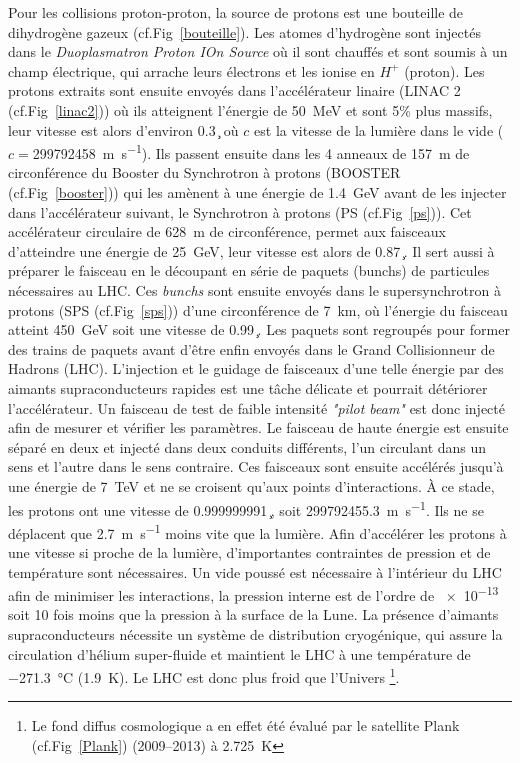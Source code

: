Pour les collisions proton-proton, la source de protons est une bouteille de dihydrogène gazeux (cf.Fig~\ref{bouteille}). Les atomes d’hydrogène sont injectés dans le \textit{Duoplasmatron Proton IOn Source} où il sont chauffés et sont soumis à un champ électrique, qui arrache leurs électrons et les ionise en $H^{+}$ (proton). Les protons extraits sont ensuite envoyés dans l'accélérateur linaire (LINAC 2 (cf.Fig~\ref{linac2})) où ils atteignent l'énergie de \SI{50}{\mega\eV} et sont \num{5}\% plus massifs, leur vitesse est alors d'environ \SI{0.3}{\c} où $c$ est la vitesse de la lumière dans le vide ($c=$\SI{299 792 458}{\meter\per\second}). Ils passent ensuite dans les \num{4} anneaux de \SI{157}{\meter} de circonférence du Booster du Synchrotron à protons (BOOSTER (cf.Fig~\ref{booster})) qui les amènent à une énergie de \SI{1.4}{\giga\eV} avant de les injecter dans l'accélérateur suivant, le Synchrotron à protons (PS (cf.Fig~\ref{ps})). Cet accélérateur circulaire de \SI{628}{\meter} de circonférence, permet aux faisceaux d'atteindre une énergie de \SI{25}{\giga\eV}, leur vitesse est alors de \SI{0.87}{\c}. Il sert aussi à préparer le faisceau en le découpant en série de paquets (bunchs) de particules nécessaires au LHC. Ces \textit{bunchs} sont ensuite envoyés dans le supersynchrotron à protons (SPS (cf.Fig~\ref{sps})) d'une circonférence de \SI{7}{\kilo\meter}, où l'énergie du faisceau atteint \SI{450}{\giga\eV} soit une vitesse de \SI{0.99}{\c}. Les paquets sont regroupés pour former des trains de paquets avant d'être enfin envoyés dans le Grand Collisionneur de Hadrons (LHC). L'injection et le guidage de faisceaux d'une telle énergie par des aimants supraconducteurs rapides est une tâche délicate et pourrait détériorer l'accélérateur. Un faisceau de test de faible intensité \textit{"pilot beam"} est donc injecté afin de mesurer et vérifier les paramètres. Le faisceau de haute énergie est ensuite séparé en deux et injecté dans deux conduits différents, l'un circulant dans un sens et l'autre dans le sens contraire. Ces faisceaux sont ensuite accélérés jusqu'à une énergie de \SI{7}{\tera\eV} et ne se croisent qu'aux points d'interactions. À ce stade, les protons ont une vitesse de \SI{0.999999991}{\c}, soit \SI{299 792 455,3}{\meter\per\second}. Ils ne se déplacent que \SI{2.7}{\meter\per\second} moins vite que la lumière. Afin d'accélérer les protons à une vitesse si proche de la lumière, d'importantes contraintes de pression et de température sont nécessaires. Un vide poussé est nécessaire à l'intérieur du LHC afin de minimiser les interactions, la pression interne est de l'ordre de \SI{e-13}{\atm} soit \num{10} fois moins que la pression à la surface de la Lune. La présence d'aimants supraconducteurs nécessite un système de distribution cryogénique, qui assure la circulation d'hélium super-fluide et maintient le LHC à une température de \SI{-271,3}{\celsius} (\SI{1.9}{\kelvin}). Le LHC est donc plus froid que l'Univers \footnote{Le fond diffus cosmologique a en effet été évalué par le satellite Plank (cf.Fig~\ref{Plank}) (\num{2009}--\num{2013}) à \SI{2,725}{\kelvin}}.


